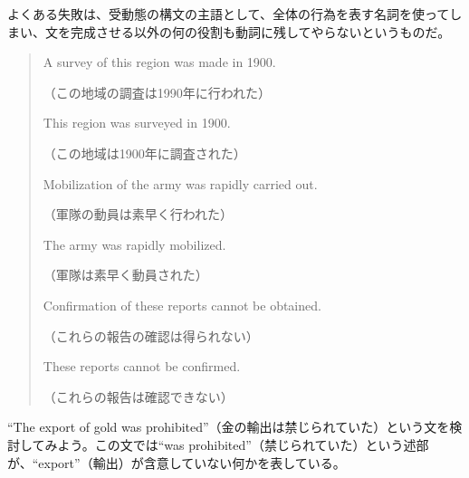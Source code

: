 よくある失敗は、受動態の構文の主語として、全体の行為を表す名詞を使ってしまい、文を完成させる以外の何の役割も動詞に残してやらないというものだ。
\begin{quote}
    A survey of this region was made in 1900.
    
    （この地域の調査は1990年に行われた）
    
    This region was surveyed in 1900.
    
    （この地域は1900年に調査された）
    
    Mobilization of the army was rapidly carried out.
    
    （軍隊の動員は素早く行われた）
    
    The army was rapidly mobilized.
    
    （軍隊は素早く動員された）
    
    Confirmation of these reports cannot be obtained.
    
    （これらの報告の確認は得られない）
    
    These reports cannot be confirmed.
    
    （これらの報告は確認できない）
\end{quote}
``The export of gold was
prohibited''（金の輸出は禁じられていた）という文を検討してみよう。この文では``was
prohibited''（禁じられていた）という述部が、``export''（輸出）が含意していない何かを表している。
